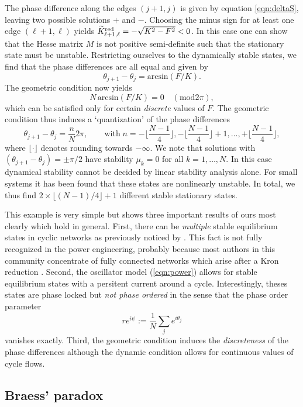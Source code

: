 \documentclass[10pt,aps,pre,preprint,superscriptaddress]{revtex4-1}
\newcommand{\be}{\begin{equation}}
\newcommand{\ee}{\end{equation}}
\begin{document}
The phase difference along the edges $(j+1,j)$ is
given by equation \eqref{eqn:deltaS}, leaving two possible solutions
$+$ and $-$. Choosing the minus sign for at least one edge $(\ell+1,\ell)$ 
yields $\widetilde K_{\ell+1,\ell}^{\rm red} = - \sqrt{K^2 - F^2} < 0$.
In this case one can show that the Hesse matrix $M$ is not positive
semi-definite such that the stationary state must be unstable. Restricting
ourselves to the dynamically stable states, we find that the phase 
differences are all equal and given by
\be
     \theta_{j+1} - \theta_j = \mbox{arcsin}(F/K).
\ee
The geometric condition now yields
\be
    N \, \mbox{arcsin}(F/K) = 0 \quad (\mbox{mod} 2 \pi),
\ee
which can be satisfied only for certain \emph{discrete} values of $F$. The
geometric condition thus induces a `quantization' of the phase differences
\be
   \theta_{j+1} - \theta_j = \frac{n}{N} 2 \pi, \qquad \mbox{with} \; 
    n = - \lfloor \frac{N-1}{4} \rfloor, - \lfloor \frac{N-1}{4} \rfloor+1, 
           \ldots, + \lfloor \frac{N-1}{4} \rfloor,
\ee
where $\lfloor \cdot \rfloor$ denotes rounding towards $- \infty$. We note that
solutions with $(\theta_{j+1} - \theta_j) = \pm \pi/2$ have stability $\mu_k = 0$
for all $k = 1,\ldots,N$. In this case dynamical stability cannot be decided by
linear stability analysis alone. For small systems it has been found that these states
are nonlinearly unstable. 
In total, we thus find $2 \times \lfloor (N-1)/4 \rfloor +1$ different stable stationary 
states.

This example is very simple but shows three important results
of ours most clearly which hold in general.
First, there can be \emph{multiple} stable equilibrium states in cyclic
networks as previously noticed by \cite{Ocha09,Tayl12,Ioni13,Meht14}. 
This fact is not fully recognized in the power engineering, probably 
because most authors in this community concentrate of fully connected 
networks which arise after a Kron reduction \cite{Tayl12,Mott13}.
Second, the oscillator model (\ref{eqn:power}) allows for 
stable equilibrium states with a persitent current around a cycle.
Interestingly, theses states are phase locked but \emph{not phase
ordered} in the sense that the phase order parameter
\cite{Stro00}
\be
   r e^{i \psi} := \frac{1}{N} \sum_j e^{i \theta_j} 
   \label{eqn:deforder}
\ee
vanishes exactly.
Third, the geometric condition induces the 
\emph{discreteness} of the phase differences
although the dynamic condition allows for continuous
values of cycle flows.


\subsection{Braess' paradox}
\label{sec:braess}
\end{document}
